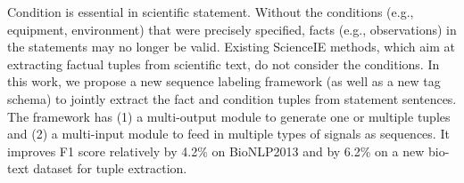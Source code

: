 Condition is essential in scientific statement. Without the conditions (e.g., equipment, environment) that were precisely specified, facts (e.g., observations) in the statements may no longer be valid. Existing ScienceIE methods, which aim at extracting factual tuples from scientific text, do not consider the conditions. In this work, we propose a new sequence labeling framework (as well as a new tag schema) to jointly extract the fact and condition tuples from statement sentences. The framework has (1) a multi-output module to generate one or multiple tuples and (2) a multi-input module to feed in multiple types of signals as sequences. It improves F1 score relatively by 4.2\% on BioNLP2013 and by 6.2\% on a new bio-text dataset for tuple extraction.